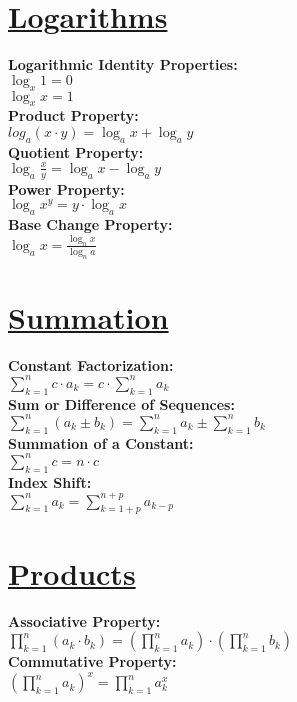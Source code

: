 \documentclass[12pt]{article}
\begin{document}
\section*{\underline{\textbf{Logarithms}}}
\textbf{Logarithmic Identity Properties:}
    \\ \( \log_x{1} = 0 \)
    \\ \( \log_x{x} = 1 \)
\\ \textbf{Product Property:}
    \\ \( log_a{(x \cdot y)} = \log_a{x} + \log_a{y} \)
\\ \textbf{Quotient Property:}
    \\ \( \log_a{\displaystyle\frac{ x }{ y }} = \log_a{x} - \log_a{y} \)
\\ \textbf{Power Property:}
    \\ \( \log_a{x^y} = y \cdot \log_a{x} \)
\\ \textbf{Base Change Property:}
    \\ \( \log_a{x} = \displaystyle\frac{ \log_n{x} }{ \log_n{a} } \)



\section*{\underline{\textbf{Summation}}}
\textbf{Constant Factorization:}
    \\ \( \displaystyle\sum_{k=1}^{n} {c \cdot a_k } = c \cdot \displaystyle\sum_{k=1}^{n} { a_k } \)
\\ \textbf{Sum or Difference of Sequences:}
    \\ \( \displaystyle\sum_{k = 1}^{n} {(a_k \pm b_k)} = \displaystyle\sum_{k = 1}^{n} {a_k} \pm \displaystyle\sum_{k = 1}^{n} {b_k} \)
\\ \textbf{Summation of a Constant:}
    \\ \( \displaystyle\sum_{k = 1}^{n} {c} = n \cdot c \)
\\ \textbf{Index Shift:}
    \\ \( \displaystyle\sum_{k = 1}^{n} {a_k} = \displaystyle\sum_{k = 1 + p}^{n + p} {a_{k-p}} \)



\section*{\underline{\textbf{Products}}}
\textbf{Associative Property:}
    \\ \( \prod_{k = 1}^{n} {(a_k \cdot b_k)} = \left( \prod_{k = 1}^{n} {a_k} \right) \cdot \left( \prod_{k = 1}^{n} {b_k} \right) \)
\\ \textbf{Commutative Property:}
    \\ \( \left( \prod_{k = 1}^{n} {a_k} \right)^x = \prod_{k = 1}^{n} {a_k^x} \)
\end{document}
